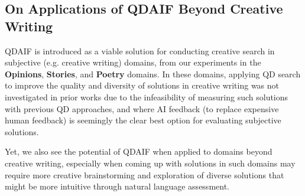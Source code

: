 \clearpage
\newpage
\subsection{On Applications of QDAIF Beyond Creative Writing}\label{app:coding_domain}
QDAIF is introduced as a viable solution for conducting creative search in subjective (e.g. creative writing) domains, from our experiments in the \textbf{Opinions}, \textbf{Stories}, and \textbf{Poetry} domains. In these domains, applying QD search to improve the quality and diversity of solutions in creative writing was not investigated in prior works due to the infeasibility of measuring such solutions with previous QD approaches, and where AI feedback (to replace expensive human feedback) is seemingly the clear best option for evaluating subjective solutions.

Yet, we also see the potential of QDAIF when applied to domains beyond creative writing, especially when coming up with solutions in such domains may require more creative brainstorming and exploration of diverse solutions that might be more intuitive through natural language assessment.

